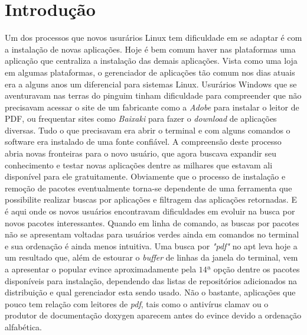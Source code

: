 \chapter{Introdução}
\label{cha:introducao}



Um dos processos  que novos usurários Linux tem dificuldade em se adaptar é com a instalação de novas aplicações. Hoje é bem comum haver nas plataformas uma aplicação que centraliza a instalação das demais aplicações. Vista como uma loja em algumas plataformas, o gerenciador de aplicações tão comum nos dias atuais era a alguns anos um diferencial para sistemas Linux. Usurários Windows que se aventuravam nas terras do pinguim  tinham dificuldade para compreender que não precisavam acessar o site de um fabricante como a \textit{Adobe} para instalar o leitor de PDF, ou frequentar sites como \textit{Baixaki} para fazer o \textit{download} de aplicações diversas. Tudo o que precisavam era abrir o terminal e com alguns comandos o software era instalado de uma fonte confiável. A compreensão deste processo abria novas fronteiras para o novo usuário, que agora buscava expandir seu conhecimento e testar novas aplicações dentre as milhares que estavam ali disponível para ele gratuitamente. Obviamente que o processo de instalação e remoção de pacotes eventualmente torna-se dependente de uma ferramenta que possibilite realizar buscas por aplicações e filtragem das aplicações retornadas. E é aqui onde os novos usuários encontravam dificuldades em evoluir na busca por novos pacotes interessantes. Quando em linha de comando, as buscas por pacotes não se apresentam voltadas para usuários verdes ainda em comandos no terminal e sua ordenação é ainda menos intuitiva. Uma busca por \textit{"pdf"} no {\code apt} leva hoje a um resultado que, além de estourar o \textit{buffer} de linhas da janela do terminal, vem a apresentar o popular {\code evince} aproximadamente pela $14ª$ opção dentre os  pacotes disponíveis para instalação, dependendo das listas de repositórios adicionados na distribuição e qual gerenciador esta sendo usado.
Não o bastante, aplicações que pouco tem relação com leitores de \textit{pdf}, tais como o antivírus {\code clamav} ou o produtor de documentação {\code doxygen} aparecem antes do {\code evince} devido a ordenação alfabética.

